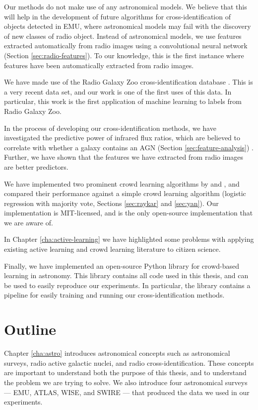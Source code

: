   Our methods do not make use of any astronomical models. We believe that this
  will help in the development of future algorithms for cross-identification of
  objects detected in EMU, where astronomical models may fail with the discovery
  of new classes of radio object. Instead of astronomical models, we use
  features extracted automatically from radio images using a convolutional
  neural network (Section \ref{sec:radio-features}). To our knowledge, this is
  the first instance where features have been automatically extracted from radio
  images.

  We have made use of the Radio Galaxy Zoo cross-identification database
  \citep{banfield15}. This is a very recent data set, and our work is one of the
  first uses of this data. In particular, this work is the first application of
  machine learning to labels from Radio Galaxy Zoo.

  In the process of developing our cross-identification methods, we have
  investigated the predictive power of infrared flux ratios, which are believed
  to correlate with whether a galaxy contains an AGN (Section
  \ref{sec:feature-analysis}) \citep{banfield15}. Further, we have shown that
  the features we have extracted from radio images are better predictors.

  We have implemented two prominent crowd learning algorithms by
  \citet{raykar10} and \citet{yan10}, and compared their performance against a
  simple crowd learning algorithm (logistic regression with majority vote,
  Sections \ref{sec:raykar} and \ref{sec:yan}). Our implementation is
  MIT-licensed, and is the only open-source implementation that we are aware of.

  In Chapter \ref{cha:active-learning} we have highlighted some problems with
  applying existing active learning and crowd learning literature to citizen
  science.

  Finally, we have implemented an open-source Python library for crowd-based
  learning in astronomy. This library contains all code used in this thesis, and
  can be used to easily reproduce our experiments. In particular, the library
  contains a pipeline for easily training and running our cross-identification
  methods.

\section{Outline}
\label{sec:outline}
  
  Chapter \ref{cha:astro} introduces astronomical concepts such as astronomical
  surveys, radio active galactic nuclei, and radio cross-identification. These
  concepts are important to understand both the purpose of this thesis, and to
  understand the problem we are trying to solve. We also introduce four
  astronomical surveys --- EMU, ATLAS, WISE, and SWIRE --- that produced the
  data we used in our experiments.

